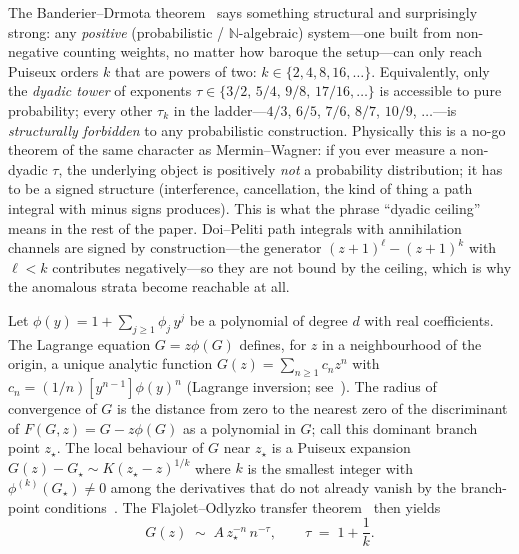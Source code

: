 \documentclass[11pt,a4paper]{article}
\newcommand{\NN}{\mathbb{N}}
\theoremstyle{plain}
\theoremstyle{remark}
\begin{document}
The Banderier--Drmota theorem~\citep{BanderierDrmota2015} says
something structural and surprisingly strong: any \emph{positive}
(probabilistic / $\NN$-algebraic) system---one built from
non-negative counting weights, no matter how baroque the setup---can
only reach Puiseux orders $k$ that are powers of two:
$k\in\{2,4,8,16,\ldots\}$.  Equivalently, only the \emph{dyadic
tower} of exponents $\tau\in\{3/2,\,5/4,\,9/8,\,17/16,\ldots\}$
is accessible to pure probability; every other $\tau_{k}$ in
the ladder---$4/3$, $6/5$, $7/6$, $8/7$, $10/9$, $\ldots$---is
\emph{structurally forbidden} to any probabilistic construction.
Physically this is a no-go theorem of the same character as
Mermin--Wagner: if you ever measure a non-dyadic $\tau$, the
underlying object is positively \emph{not} a probability
distribution; it has to be a signed structure (interference,
cancellation, the kind of thing a path integral with minus signs
produces).  This is what the phrase ``dyadic ceiling'' means in
the rest of the paper.  Doi--Peliti path integrals with
annihilation channels are signed by construction---the generator
$(z+1)^{\ell}-(z+1)^{k}$ with $\ell<k$ contributes
negatively---so they are not bound by the ceiling, which is why
the anomalous strata become reachable at all.

Let $\phi(y) = 1 + \sum_{j\geq 1}\phi_{j}\,y^{j}$ be a polynomial
of degree $d$ with real coefficients.  The Lagrange
equation $G = z\phi(G)$ defines, for $z$ in a neighbourhood of
the origin, a unique analytic function $G(z) = \sum_{n\geq 1} c_{n}z^{n}$
with $c_{n} = (1/n)[y^{n-1}]\phi(y)^{n}$
(Lagrange inversion; see~\citet[Ch.~A.6]{FlajoletSedgewick}).
The radius of convergence of $G$ is the distance from zero to
the nearest zero of the discriminant of $F(G,z) = G - z\phi(G)$
as a polynomial in $G$; call this dominant branch point
$z_{\star}$.  The local behaviour of $G$ near $z_{\star}$ is
a Puiseux expansion
$G(z) - G_{\star} \sim K(z_{\star} - z)^{1/k}$ where $k$ is the
smallest integer with $\phi^{(k)}(G_{\star})\neq 0$ among the
derivatives that do not already vanish by the branch-point
conditions~\citep[Thm.~VII.7]{FlajoletSedgewick}.  The
Flajolet--Odlyzko transfer theorem~\citep{FlajoletOdlyzko1990}
then yields
\begin{equation}
  [z^{n}]G(z) \;\sim\; A\,z_{\star}^{-n}\,n^{-\tau},
  \qquad
  \tau \;=\; 1 + \frac{1}{k}.
  \label{eq:transfer}
\end{equation}
\end{document}
